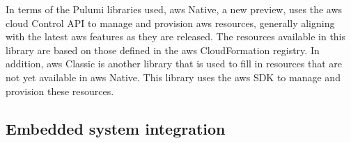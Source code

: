 In terms of the Pulumi libraries used, \gls{aws} Native, a new preview, uses the \gls{aws} \Gls{cloud} Control API to manage and provision \gls{aws} resources, generally aligning with the latest \gls{aws} features as they are released. The resources available in this library are based on those defined in the \gls{aws} CloudFormation registry. In addition, \gls{aws} Classic is another library that is used to fill in resources that are not yet available in \gls{aws} Native. This library uses the \gls{aws} SDK to manage and provision these resources.


\subsection{Embedded system integration}